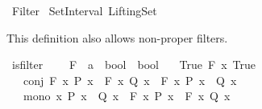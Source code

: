 %
\begin{isabellebody}%
%
%
\isadelimdocument
%
\endisadelimdocument
%
\isatagdocument
%
\isamarkuptrue%
%
\endisatagdocument
{\isafolddocument}%
%
\isadelimdocument
%
\endisadelimdocument
%
\isadelimtheory
%
\endisadelimtheory
%
\isatagtheory
{}\isamarkupfalse%
\ Filter\isanewline
{}\ Set{\isacharunderscore}{\kern0pt}Interval\ Lifting{\isacharunderscore}{\kern0pt}Set\isanewline
{}%
\endisatagtheory
{\isafoldtheory}%
%
\isadelimtheory
%
\endisadelimtheory
%
\isadelimdocument
%
\endisadelimdocument
%
\isatagdocument
%
\isamarkuptrue%
%
\endisatagdocument
{\isafolddocument}%
%
\isadelimdocument
%
\endisadelimdocument
%
\begin{isamarkuptext}%
This definition also allows non-proper filters.%
\end{isamarkuptext}\isamarkuptrue%
\isamarkupfalse%
\ is{\isacharunderscore}{\kern0pt}filter\ {\isacharequal}{\kern0pt}\isanewline
\ \ \ F\ {\isacharcolon}{\kern0pt}{\isacharcolon}{\kern0pt}\ {\isachardoublequoteopen}{\isacharparenleft}{\kern0pt}{\isacharprime}{\kern0pt}a\ {\isasymRightarrow}\ bool{\isacharparenright}{\kern0pt}\ {\isasymRightarrow}\ bool{\isachardoublequoteclose}\isanewline
\ \ \ True{\isacharcolon}{\kern0pt}\ {\isachardoublequoteopen}F\ {\isacharparenleft}{\kern0pt}{\isasymlambda}x{\isachardot}{\kern0pt}\ True{\isacharparenright}{\kern0pt}{\isachardoublequoteclose}\isanewline
\ \ \ conj{\isacharcolon}{\kern0pt}\ {\isachardoublequoteopen}F\ {\isacharparenleft}{\kern0pt}{\isasymlambda}x{\isachardot}{\kern0pt}\ P\ x{\isacharparenright}{\kern0pt}\ {\isasymLongrightarrow}\ F\ {\isacharparenleft}{\kern0pt}{\isasymlambda}x{\isachardot}{\kern0pt}\ Q\ x{\isacharparenright}{\kern0pt}\ {\isasymLongrightarrow}\ F\ {\isacharparenleft}{\kern0pt}{\isasymlambda}x{\isachardot}{\kern0pt}\ P\ x\ {\isasymand}\ Q\ x{\isacharparenright}{\kern0pt}{\isachardoublequoteclose}\isanewline
\ \ \ mono{\isacharcolon}{\kern0pt}\ {\isachardoublequoteopen}{\isasymforall}x{\isachardot}{\kern0pt}\ P\ x\ {\isasymlongrightarrow}\ Q\ x\ {\isasymLongrightarrow}\ F\ {\isacharparenleft}{\kern0pt}{\isasymlambda}x{\isachardot}{\kern0pt}\ P\ x{\isacharparenright}{\kern0pt}\ {\isasymLongrightarrow}\ F\ {\isacharparenleft}{\kern0pt}{\isasymlambda}x{\isachardot}{\kern0pt}\ Q\ x{\isacharparenright}{\kern0pt}{\isachardoublequoteclose}\isanewline

\end{isabellebody}
